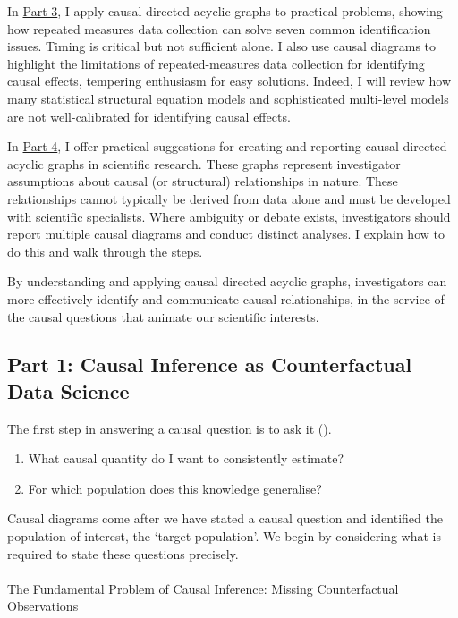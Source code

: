 \documentclass[
  single column]{article}
\makeatletter
\let\oldparagraph\paragraph
\renewcommand{\paragraph}{
    \@ifstar
      \xxxParagraphStar
      \xxxParagraphNoStar
  }
\newcommand{\xxxParagraphStar}[1]{\oldparagraph*{#1}\mbox{}}
\newcommand{\xxxParagraphNoStar}[1]{\oldparagraph{#1}\mbox{}}
\providecommand{\tightlist}{%
  \setlength{\itemsep}{0pt}\setlength{\parskip}{0pt}}\usepackage{longtable,booktabs,array}
\makeatother
\begin{document}
In \hyperref[id-sec-3]{Part 3}, I apply causal directed acyclic graphs
to practical problems, showing how repeated measures data collection can
solve seven common identification issues. Timing is critical but not
sufficient alone. I also use causal diagrams to highlight the
limitations of repeated-measures data collection for identifying causal
effects, tempering enthusiasm for easy solutions. Indeed, I will review
how many statistical structural equation models and sophisticated
multi-level models are not well-calibrated for identifying causal
effects.

In \hyperref[id-sec-4]{Part 4}, I offer practical suggestions for
creating and reporting causal directed acyclic graphs in scientific
research. These graphs represent investigator assumptions about causal
(or structural) relationships in nature. These relationships cannot
typically be derived from data alone and must be developed with
scientific specialists. Where ambiguity or debate exists, investigators
should report multiple causal diagrams and conduct distinct analyses. I
explain how to do this and walk through the steps.

By understanding and applying causal directed acyclic graphs,
investigators can more effectively identify and communicate causal
relationships, in the service of the causal questions that animate our
scientific interests.

\subsection{Part 1: Causal Inference as Counterfactual Data
Science}\label{id-sec-1}

The first step in answering a causal question is to ask it
().

\begin{enumerate}
\def\labelenumi{\arabic{enumi}.}
\tightlist
\item
  What causal quantity do I want to consistently estimate?
\item
  For which population does this knowledge generalise?
\end{enumerate}

Causal diagrams come after we have stated a causal question and
identified the population of interest, the `target population'. We begin
by considering what is required to state these questions precisely.

\paragraph{The Fundamental Problem of Causal Inference: Missing
Counterfactual
Observations}\label{the-fundamental-problem-of-causal-inference-missing-counterfactual-observations}
\end{document}
